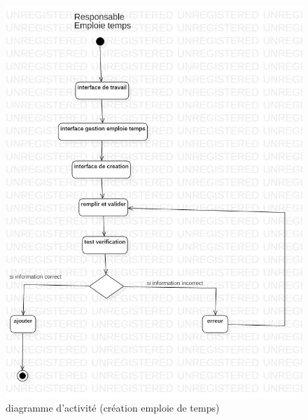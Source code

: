\documentclass[english,12pt,a4paper]{report}
\begin{document}
\begin{figure}[h]
	\centering
	\includegraphics*[height=0.7 \textheight]{ActivityCreeEmploieTemps.jpg}
	\caption{diagramme d'activité (création emploie de temps)}
	\label{fig9: diagramme d'activité (creation emploie de temps)}
\end{figure}
\clearpage
\end{document}
